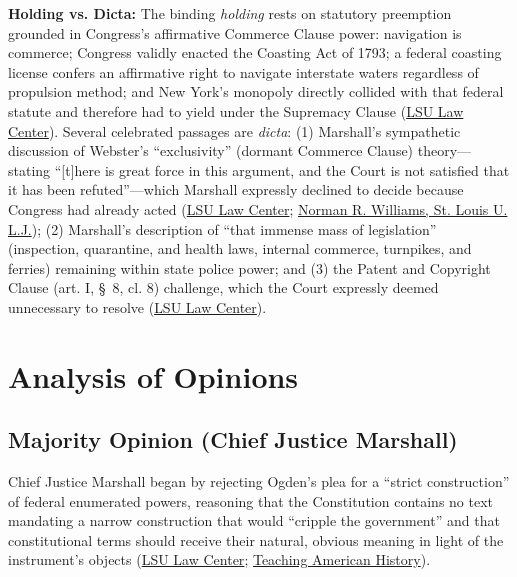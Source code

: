 \documentclass[12pt]{article}
\begin{document}
\textbf{Holding vs. Dicta:} The binding \emph{holding} rests on statutory preemption grounded in Congress's affirmative Commerce Clause power: navigation is commerce; Congress validly enacted the Coasting Act of 1793; a federal coasting license confers an affirmative right to navigate interstate waters regardless of propulsion method; and New York's monopoly directly collided with that federal statute and therefore had to yield under the Supremacy Clause (\href{https://biotech.law.lsu.edu/cases/pp/Gibbons.htm}{LSU Law Center}). Several celebrated passages are \emph{dicta}: (1) Marshall's sympathetic discussion of Webster's ``exclusivity'' (dormant Commerce Clause) theory---stating ``[t]here is great force in this argument, and the Court is not satisfied that it has been refuted''---which Marshall expressly declined to decide because Congress had already acted (\href{https://biotech.law.lsu.edu/cases/pp/Gibbons.htm}{LSU Law Center}; \href{https://scholarship.law.slu.edu/cgi/viewcontent.cgi?article=1753&context=lj}{Norman R. Williams, St. Louis U. L.J.}); (2) Marshall's description of ``that immense mass of legislation'' (inspection, quarantine, and health laws, internal commerce, turnpikes, and ferries) remaining within state police power; and (3) the Patent and Copyright Clause (art. I, \S~8, cl. 8) challenge, which the Court expressly deemed unnecessary to resolve (\href{https://biotech.law.lsu.edu/cases/pp/Gibbons.htm}{LSU Law Center}).

\section{Analysis of Opinions}
\subsection{Majority Opinion (Chief Justice Marshall)}
Chief Justice Marshall began by rejecting Ogden's plea for a ``strict construction'' of federal enumerated powers, reasoning that the Constitution contains no text mandating a narrow construction that would ``cripple the government'' and that constitutional terms should receive their natural, obvious meaning in light of the instrument's objects (\href{https://biotech.law.lsu.edu/cases/pp/Gibbons.htm}{LSU Law Center}; \href{https://teachingamericanhistory.org/document/gibbons-v-ogden/}{Teaching American History}).
\end{document}
